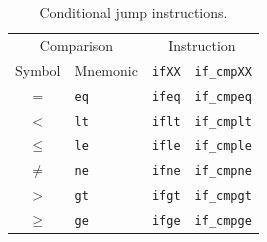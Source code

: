 \begin{table}[htp]
  \centering
  \caption*{Conditional jump instructions.}
  \begin{tabular}{clll}
    \toprule
    \multicolumn{2}{c}{Comparison} & \multicolumn{2}{c}{Instruction} \\
    Symbol & Mnemonic & \texttt{ifXX} & \texttt{if\_cmpXX} \\
    \midrule
    \( = \)    & \texttt{eq} & \texttt{ifeq} & \texttt{if\_cmpeq} \\
    \( < \)    & \texttt{lt} & \texttt{iflt} & \texttt{if\_cmplt} \\
    \( \leq \) & \texttt{le} & \texttt{ifle} & \texttt{if\_cmple} \\
    \( \neq \) & \texttt{ne} & \texttt{ifne} & \texttt{if\_cmpne} \\
    \( > \)    & \texttt{gt} & \texttt{ifgt} & \texttt{if\_cmpgt} \\
    \( \geq \) & \texttt{ge} & \texttt{ifge} & \texttt{if\_cmpge} \\
    \bottomrule
  \end{tabular}
\end{table}
